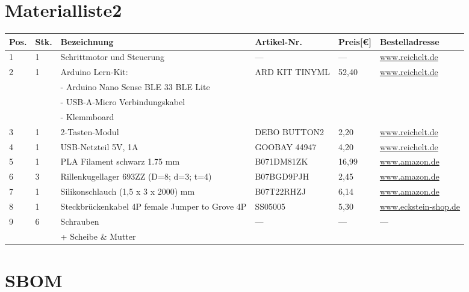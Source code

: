 \documentclass[12pt,a4paper]{scrbook}
\begin{document}
\chapter{Materialliste2}
\begin{center}
	\fontsize{8}{10}\selectfont
	\begin{tabularx}{\textwidth}{|p{0.4cm}|p{0.4cm}|X|X|p{1cm}|X|}
		\hline 
		\textbf{Pos.} & \textbf{Stk.} & \textbf{Bezeichnung} & \textbf{Artikel-Nr.} & \textbf{Preis[€]} & \textbf{Bestelladresse} \\ \hline
		1 & 1 & Schrittmotor und Steuerung & --- & --- & \href{https://www.reichelt.de}{www.reichelt.de} \\
		\hline
		2 & 1 & Arduino Lern-Kit: & ARD KIT TINYML & 52,40 & \href{https://www.reichelt.de}{www.reichelt.de} \\
		&   & - Arduino Nano Sense BLE 33 BLE Lite & & & \\ 
		&   &- USB-A-Micro Verbindungskabel & & & \\
		&   &- Klemmboard & & & \\
		\hline
		3 & 1 & 2-Tasten-Modul & DEBO BUTTON2 & 2,20 & \href{https://www.reichelt.de}{www.reichelt.de} \\ 
		\hline
		4 & 1 & USB-Netzteil 5V, 1A & GOOBAY 44947 & 4,20 & \href{https://www.reichelt.de}{www.reichelt.de} \\ 
		\hline
		5 & 1 & PLA Filament schwarz 1.75 mm  & B071DM81ZK & 16,99 & \href{https://wwww.amazon.de}{www.amazon.de} \\ 
		\hline
		6 & 3 & Rillenkugellager 693ZZ (D=8; d=3; t=4) &  B07BGD9PJH  & 2,45 &
		\href{https://www.amazon.de}{www.amazon.de} \\
		\hline
		7 & 1 & Silikonschlauch (1,5 x 3 x 2000) mm & B07T22RHZJ & 6,14 &
		\href{https://www.amazon.de}{www.amazon.de} \\
		\hline
		8 & 1 & Steckbrückenkabel 4P female Jumper to Grove 4P & SS05005 & 5,30 & \href{https://eckstein-shop.de}{www.eckstein-shop.de} \\ 
		\hline
		9 & 6 & Schrauben & --- & --- &	--- \\ 
		&   & + Scheibe \& Mutter & & \\
		\hline
	\end{tabularx}
	
\end{center}
\chapter{SBOM}
\end{document}
